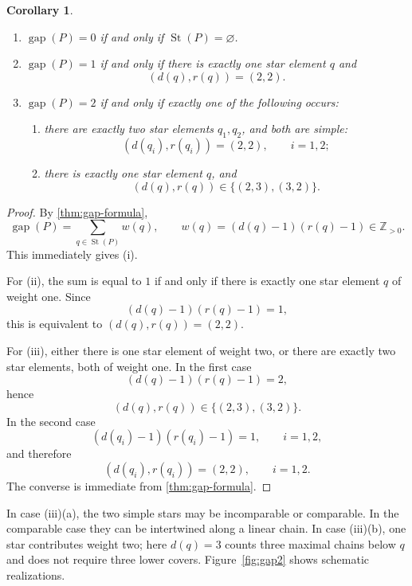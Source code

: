 \documentclass[a4paper, 11pt]{amsart}
\newtheorem{corollary}[theorem]{Corollary}
\theoremstyle{definition}
\theoremstyle{remark}
\newcommand{\gap}{\operatorname{gap}}
\newcommand{\St}{\operatorname{St}}
\begin{document}
\begin{corollary}\label{cor:smallgap}
\begin{enumerate}[label=\textup{(\roman*)}]
  \item $\gap(P)=0$ if and only if $\St(P)=\varnothing$.
  \item $\gap(P)=1$ if and only if there is exactly one star element $q$ and
  \[
     (d(q),r(q))=(2,2).
  \]
  \item $\gap(P)=2$ if and only if exactly one of the following occurs:
  \begin{enumerate}[label=\textup{(\alph*)}]
    \item there are exactly two star elements $q_1,q_2$, and both are simple:
    \[
       (d(q_i),r(q_i))=(2,2),\qquad i=1,2;
    \]
    \item there is exactly one star element $q$, and
    \[
       (d(q),r(q))\in\{(2,3),(3,2)\}.
    \]
  \end{enumerate}
\end{enumerate}
\end{corollary}

\begin{proof}
By \cref{thm:gap-formula},
\[
  \gap(P)=\sum_{q\in\St(P)} w(q),
  \qquad
  w(q)=(d(q)-1)(r(q)-1)\in\mathbb Z_{>0}.
\]
This immediately gives (i).

For (ii), the sum is equal to $1$ if and only if there is exactly one
star element $q$ of weight one. Since
\[
  (d(q)-1)(r(q)-1)=1,
\]
this is equivalent to $(d(q),r(q))=(2,2)$.

For (iii), either there is one star element of weight two, or there are
exactly two star elements, both of weight one. In the first case
\[
  (d(q)-1)(r(q)-1)=2,
\]
hence
\[
  (d(q),r(q))\in\{(2,3),(3,2)\}.
\]
In the second case
\[
  (d(q_i)-1)(r(q_i)-1)=1,\qquad i=1,2,
\]
and therefore
\[
  (d(q_i),r(q_i))=(2,2),\qquad i=1,2.
\]
The converse is immediate from \cref{thm:gap-formula}.
\end{proof}

In case \textup{(iii)(a)}, the two simple stars may be incomparable or comparable. In the comparable case they can be intertwined along a linear chain. In case \textup{(iii)(b)}, one star contributes weight two; here $d(q)=3$ counts three maximal chains below $q$ and does not require three lower covers. Figure~\ref{fig:gap2} shows schematic realizations.
\end{document}
